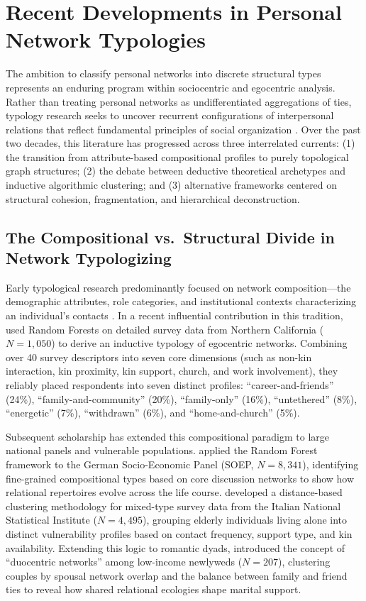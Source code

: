 \documentclass[12pt]{article}
\begin{document}
\section{Recent Developments in Personal Network Typologies}

The ambition to classify personal networks into discrete structural types represents an enduring program within sociocentric and egocentric analysis. Rather than treating personal networks as undifferentiated aggregations of ties, typology research seeks to uncover recurrent configurations of interpersonal relations that reflect fundamental principles of social organization \citep{fischer1982dwell, mccarty2002structure, perry2018egocentric}. Over the past two decades, this literature has progressed across three interrelated currents: (1) the transition from attribute-based compositional profiles to purely topological graph structures; (2) the debate between deductive theoretical archetypes and inductive algorithmic clustering; and (3) alternative frameworks centered on structural cohesion, fragmentation, and hierarchical deconstruction.

\subsection{The Compositional vs.\ Structural Divide in Network Typologizing}

Early typological research predominantly focused on network composition---the demographic attributes, role categories, and institutional contexts characterizing an individual's contacts \citep{antonucci2013convoy, offer2018does}. In a recent influential contribution in this tradition, \citet{giannella2016inductive} used Random Forests on detailed survey data from Northern California ($N = 1{,}050$) to derive an inductive typology of egocentric networks. Combining over 40 survey descriptors into seven core dimensions (such as non-kin interaction, kin proximity, kin support, church, and work involvement), they reliably placed respondents into seven distinct profiles: ``career-and-friends'' (24\%), ``family-and-community'' (20\%), ``family-only'' (16\%), ``untethered'' (8\%), ``energetic'' (7\%), ``withdrawn'' (6\%), and ``home-and-church'' (5\%).

Subsequent scholarship has extended this compositional paradigm to large national panels and vulnerable populations. \citet{laier2022inductive} applied the Random Forest framework to the German Socio-Economic Panel (SOEP, $N = 8{,}341$), identifying fine-grained compositional types based on core discussion networks to show how relational repertoires evolve across the life course. \citet{pelle2021clustering} developed a distance-based clustering methodology for mixed-type survey data from the Italian National Statistical Institute ($N = 4{,}495$), grouping elderly individuals living alone into distinct vulnerability profiles based on contact frequency, support type, and kin availability. Extending this logic to romantic dyads, \citet{kennedy2023typologies} introduced the concept of ``duocentric networks'' among low-income newlyweds ($N = 207$), clustering couples by spousal network overlap and the balance between family and friend ties to reveal how shared relational ecologies shape marital support.
\end{document}
